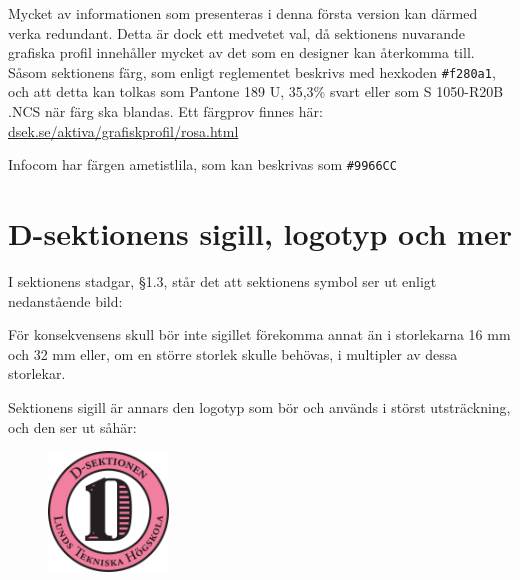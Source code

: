 \documentclass[]{dsekkallelse}
\begin{document}
Mycket av informationen som presenteras i denna första version kan därmed verka redundant. Detta är dock ett medvetet val, då sektionens nuvarande grafiska profil innehåller mycket av det som en designer kan återkomma till. Såsom sektionens färg, som enligt reglementet beskrivs med hexkoden \texttt{\#f280a1}, och att detta kan tolkas som Pantone 189 U, 35,3\% svart eller som S 1050-R20B .NCS när färg ska blandas.
Ett färgprov finnes här: \\ \href{https://www.dsek.se/aktiva/grafiskprofil/rosa.html}{dsek.se/aktiva/grafiskprofil/rosa.html}

Infocom har färgen ametistlila, som kan beskrivas som \texttt{\#9966CC}



\section{D-sektionens sigill, logotyp och mer}
I sektionens stadgar, §1.3, står det att sektionens symbol ser ut enligt nedanstående bild:
\begin{figure} [!hbp]
    \centering
    \Dsymbol[32mm]
\end{figure}

För konsekvensens skull bör inte sigillet förekomma annat än i storlekarna 16 mm och 32 mm eller, om en större storlek skulle behövas, i multipler av dessa storlekar.

Sektionens sigill är annars den logotyp som bör och används i störst utsträckning, och den ser ut såhär:
\begin{figure}[!hbp]
    \centering
    \Dlogo[32mm] \includegraphics[height=32mm]{D-logo-org-col.pdf}
    \label{fig:my_label}
\end{figure}
\end{document}
